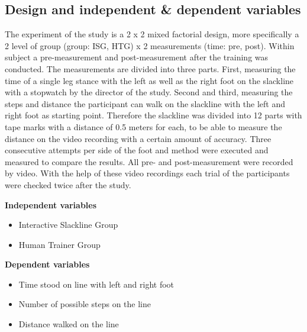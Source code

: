 \subsection{Design and independent \& dependent variables}\label{6_variables}
The experiment of the study is a 2 x 2 mixed factorial design, more specifically a 2 level of group (group: ISG, HTG)  x 2 measurements (time: pre, post).
Within subject a pre-measurement and post-measurement after the training was conducted.
The measurements are divided into three parts.
First, measuring the time of a single leg stance with the left as well as the right foot on the slackline with a stopwatch by the director of the study.
Second and third, measuring the steps and distance the participant can walk on the slackline with the left and right foot as starting point.
Therefore the slackline was divided into 12 parts with tape marks with a distance of 0.5 meters for each, to be able to measure the distance on the video recording with a certain amount of accuracy.
Three consecutive attempts per side of the foot and method were executed and measured to compare the results.
All pre- and post-measurement were recorded by video.
With the help of these video recordings each trial of the participants were checked twice after the study.

\textbf{Independent variables}
\begin{itemize}
\item Interactive Slackline Group
\item Human Trainer Group
\end{itemize}

\textbf{Dependent variables}
\begin{itemize}
\item Time stood on line with left and right foot
\item Number of possible steps on the line 
\item Distance walked on the line
\end{itemize}




